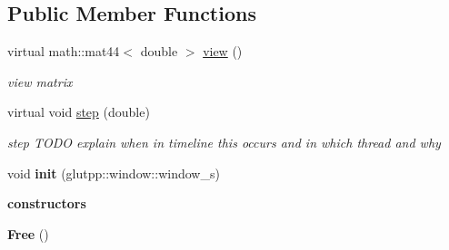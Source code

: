 \subsection*{\-Public \-Member \-Functions}
\begin{DoxyCompactItemize}
\item 
\hypertarget{classglutpp_1_1Camera_1_1View_1_1Free_a0e9b8953cdc1b529de1a6549aa55759c}{virtual math\-::mat44$<$ double $>$ \hyperlink{classglutpp_1_1Camera_1_1View_1_1Free_a0e9b8953cdc1b529de1a6549aa55759c}{view} ()}\label{classglutpp_1_1Camera_1_1View_1_1Free_a0e9b8953cdc1b529de1a6549aa55759c}

\begin{DoxyCompactList}\small\item\em view matrix \end{DoxyCompactList}\item 
\hypertarget{classglutpp_1_1Camera_1_1View_1_1Free_a2a117540633d55517305fa69cee5f336}{virtual void \hyperlink{classglutpp_1_1Camera_1_1View_1_1Free_a2a117540633d55517305fa69cee5f336}{step} (double)}\label{classglutpp_1_1Camera_1_1View_1_1Free_a2a117540633d55517305fa69cee5f336}

\begin{DoxyCompactList}\small\item\em step \-T\-O\-D\-O explain when in timeline this occurs and in which thread and why \end{DoxyCompactList}\item 
\hypertarget{classglutpp_1_1Camera_1_1View_1_1Free_a393fcaeafad6d09a4a6ec28800ac9706}{void {\bfseries init} (glutpp\-::window\-::window\-\_\-s)}\label{classglutpp_1_1Camera_1_1View_1_1Free_a393fcaeafad6d09a4a6ec28800ac9706}

\end{DoxyCompactItemize}
\begin{Indent}{\bf constructors}\par
\begin{DoxyCompactItemize}
\item 
\hypertarget{classglutpp_1_1Camera_1_1View_1_1Free_a3038c31e5a7a43d6dbf2d286e24d91c9}{{\bfseries \-Free} ()}\label{classglutpp_1_1Camera_1_1View_1_1Free_a3038c31e5a7a43d6dbf2d286e24d91c9}

\end{DoxyCompactItemize}
\end{Indent}
